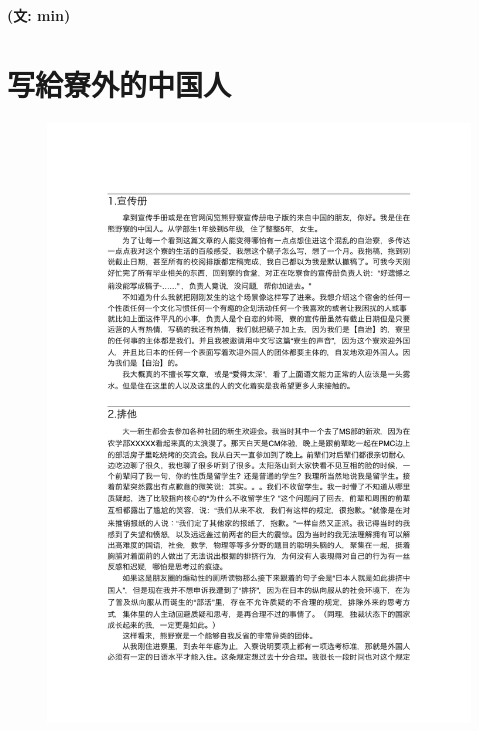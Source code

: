 \documentclass[10pt,b5jsbook,dvips,dvipdfmx,openany]{jsbook}
\theoremstyle{definition}
\begin{document}
{\bf (文: min)}

\newpage

  \section{写給寮外的中国人}
\begin{figure}[h]
		\begin{center}
 	 	\includegraphics[scale=0.90]{voice.pdf}
  \end{center}
		\end{figure}
\end{document}
